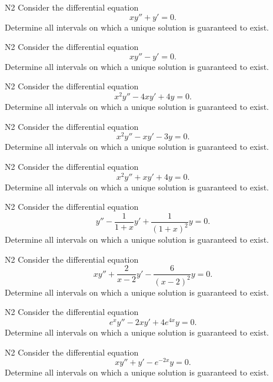 

\begin{problem}{N2}
Consider the differential equation
\[
xy'' + y' = 0.
\]
Determine all intervals on which a unique solution is guaranteed to exist.
\end{problem}

\begin{problem}{N2}
Consider the differential equation
\[
xy'' - y' = 0.
\]
Determine all intervals on which a unique solution is guaranteed to exist.
\end{problem}

\begin{problem}{N2}
Consider the differential equation
\[
x^2y'' - 4xy' + 4y = 0.
\]
Determine all intervals on which a unique solution is guaranteed to exist.
\end{problem}

\begin{problem}{N2}
Consider the differential equation
\[
x^2y'' - xy' - 3y = 0.
\]
Determine all intervals on which a unique solution is guaranteed to exist.
\end{problem}

\begin{problem}{N2}
Consider the differential equation
\[
x^2y'' + xy' + 4y = 0.
\]
Determine all intervals on which a unique solution is guaranteed to exist.
\end{problem}

\begin{problem}{N2}
Consider the differential equation
\[
y'' - \frac{1}{1+x}y' + \frac{1}{(1+x)^2}y = 0.
\]
Determine all intervals on which a unique solution is guaranteed to exist.
\end{problem}

\begin{problem}{N2}
Consider the differential equation
\[
xy'' + \frac{2}{x-2}y' - \frac{6}{(x-2)^2}y = 0.
\]
Determine all intervals on which a unique solution is guaranteed to exist.
\end{problem}

\begin{problem}{N2}
Consider the differential equation
\[
e^xy'' -2xy' + 4e^{4x}y = 0.
\]
Determine all intervals on which a unique solution is guaranteed to exist.
\end{problem}

\begin{problem}{N2}
Consider the differential equation
\[
xy'' + y' - e^{-2x}y = 0.
\]
Determine all intervals on which a unique solution is guaranteed to exist.
\end{problem}

